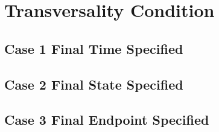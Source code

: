 \section{Transversality Condition}

\subsection{Case 1 Final Time Specified}

\subsection{Case 2 Final State Specified}

\subsection{Case 3 Final Endpoint Specified}